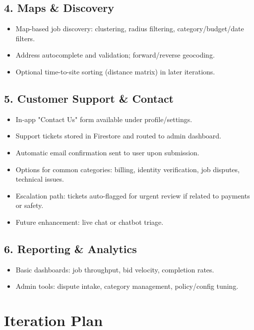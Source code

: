 \documentclass[11pt]{article}
\begin{document}
\subsection*{4. Maps \& Discovery}
\begin{itemize}[leftmargin=1.4em]
  \item Map-based job discovery: clustering, radius filtering, category/budget/date filters.
  \item Address autocomplete and validation; forward/reverse geocoding.
  \item Optional time-to-site sorting (distance matrix) in later iterations.
\end{itemize}

\subsection*{5. Customer Support \& Contact}
\begin{itemize}[leftmargin=1.4em]
  \item In-app "Contact Us" form available under profile/settings.
  \item Support tickets stored in Firestore and routed to admin dashboard.
  \item Automatic email confirmation sent to user upon submission.
  \item Options for common categories: billing, identity verification, job disputes, technical issues.
  \item Escalation path: tickets auto-flagged for urgent review if related to payments or safety.
  \item Future enhancement: live chat or chatbot triage.
\end{itemize}

\subsection*{6. Reporting \& Analytics}
\begin{itemize}[leftmargin=1.4em]
  \item Basic dashboards: job throughput, bid velocity, completion rates.
  \item Admin tools: dispute intake, category management, policy/config tuning.
\end{itemize}

\section{Iteration Plan}
\end{document}
